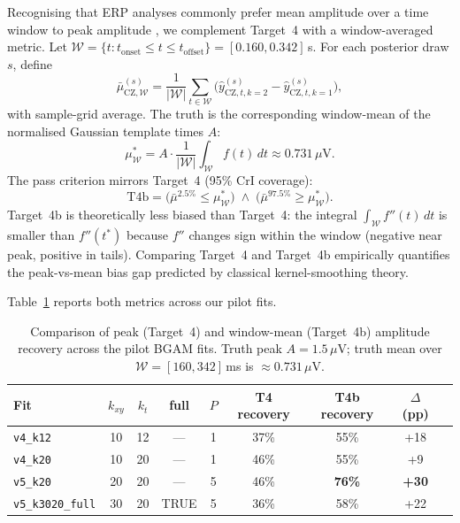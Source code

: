 \documentclass[12pt, a4paper]{article}
\begin{document}
Recognising that ERP analyses commonly prefer mean amplitude over a
time window to peak amplitude \citep[Ch.~6]{Luck2014}, we complement
Target~4 with a window-averaged metric. Let $\mathcal{W} = \{t :
t_\text{onset} \le t \le t_\text{offset}\} = [0.160, 0.342]$\,s. For each
posterior draw $s$, define
\begin{equation}
  \bar{\mu}^{(s)}_{\text{CZ}, \mathcal{W}}
    = \frac{1}{|\mathcal{W}|}
      \sum_{t \in \mathcal{W}}
      \bigl(\hat{y}^{(s)}_{\text{CZ},t,k=2}
           - \hat{y}^{(s)}_{\text{CZ},t,k=1}\bigr),
\end{equation}
with sample-grid average. The truth is the corresponding window-mean
of the normalised Gaussian template times $A$:
\begin{equation}
  \mu^*_\mathcal{W}
    = A \cdot \frac{1}{|\mathcal{W}|}
      \int_\mathcal{W} f(t)\, dt
    \approx 0.731\,\mu\mathrm{V}.
\end{equation}
The pass criterion mirrors Target~4 (95\% CrI coverage):
\begin{equation}\label{eq:t4b}
  \text{T4b} = \bigl(\bar{\mu}^{2.5\%} \le \mu^*_\mathcal{W}\bigr)
            \;\wedge\;
            \bigl(\bar{\mu}^{97.5\%} \ge \mu^*_\mathcal{W}\bigr).
\end{equation}
Target~4b is theoretically less biased than Target~4: the integral
\(\int_\mathcal{W} f''(t)\,dt\) is smaller than $f''(t^*)$ because
$f''$ changes sign within the window (negative near peak, positive in
tails). Comparing Target~4 and Target~4b empirically quantifies the
peak-vs-mean bias gap predicted by classical kernel-smoothing theory.

Table~\ref{tab:t4_comparison} reports both metrics across our pilot
fits.

\begin{table}[ht]
\centering
\caption{Comparison of peak (Target~4) and window-mean (Target~4b)
amplitude recovery across the pilot BGAM fits. Truth peak
$A = 1.5\,\mu$V; truth mean over $\mathcal{W} = [160, 342]$\,ms is
$\approx 0.731\,\mu$V.}
\label{tab:t4_comparison}
\small
\begin{tabular}{lcccccccc}
\toprule
Fit & $k_{xy}$ & $k_t$ & full & $P$ &
  T4 recovery & T4b recovery & $\Delta$ (pp) \\
\midrule
\texttt{v4\_k12}        & 10 & 12 & --- & 1 & 37\%        & 55\%        & +18 \\
\texttt{v4\_k20}        & 10 & 20 & --- & 1 & 46\%        & 55\%        & +9  \\
\texttt{v5\_k20}        & 20 & 20 & --- & 5 & 46\%        & \textbf{76\%} & \textbf{+30} \\
\texttt{v5\_k3020\_full}& 30 & 20 & TRUE & 5 & 36\%        & 58\%        & +22 \\
\bottomrule
\end{tabular}
\end{table}
\end{document}
